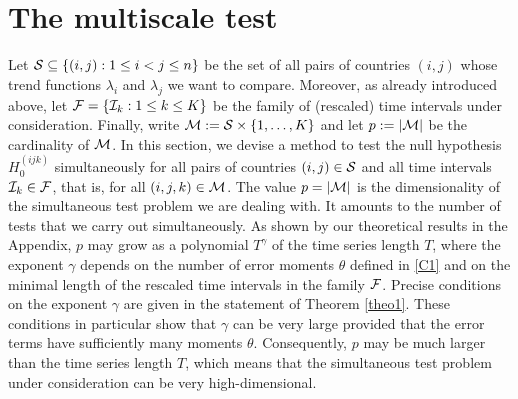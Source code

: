 \documentclass[a4paper,12pt]{article}
\numberwithin{equation}{section}
\begin{document}
\section{The multiscale test}\label{sec:test}


Let $\mathcal{S} \subseteq \{ (i,j): 1 \le i < j \le n \}$ be the set of all pairs of countries $(i,j)$ whose trend functions $\lambda_i$ and $\lambda_j$ we want to compare. Moreover, as already introduced above, let $\mathcal{F} = \{ \mathcal{I}_k: 1 \le k \le K \}$ be the family of (rescaled) time intervals under consideration. Finally, write $\mathcal{M} := \mathcal{S} \times \{1,\ldots,K\}$ and let $p := |\mathcal{M}|$ be the cardinality of $\mathcal{M}$. In this section, we devise a method to test the null hypothesis $H_0^{(ijk)}$ simultaneously for all pairs of countries $(i,j) \in \mathcal{S}$ and all time intervals $\mathcal{I}_k \in \mathcal{F}$, that is, for all $(i,j,k) \in \mathcal{M}$. The value $p = |\mathcal{M}|$ is the dimensionality of the simultaneous test problem we are dealing with. It amounts to the number of tests that we carry out simultaneously. {\color{blue} As shown by our theoretical results in the Appendix, $p$ may grow as a polynomial $T^{\gamma}$ of the time series length $T$, where the exponent $\gamma$ depends on the number of error moments $\theta$ defined in \ref{C1} and on the minimal length of the rescaled time intervals in the family $\mathcal{F}$. Precise conditions on the exponent $\gamma$ are given in the statement of Theorem \ref{theo1}. These conditions in particular show that $\gamma$ can be very large provided that the error terms have sufficiently many moments $\theta$. Consequently, $p$ may be much larger than the time series length $T$, which means that the simultaneous test problem under consideration can be very high-dimensional.} 
\end{document}
